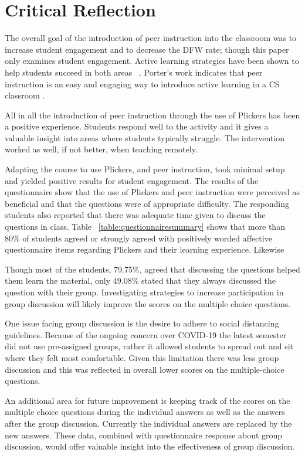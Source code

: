 \documentclass[12pt]{article}
\begin{document}
\section{Critical Reflection}

The overall goal of the introduction of peer instruction into the classroom was to increase student engagement and to decrease the DFW rate; though this paper only examines student engagement.  Active learning strategies have been shown to help students succeed in both areas ~\cite{freemanActiveLearningIncreases2014}.  Porter’s work indicates that peer instruction is an easy and engaging way to introduce active learning in a CS classroom \cite{porterPeerInstructionStudents2011}.

All in all the introduction of peer instruction through the use of Plickers has been a positive experience. Students respond well to the activity and it gives a valuable insight into areas where students typically struggle. The intervention worked as well, if not better, when teaching remotely. 

Adapting the course to use Plickers, and peer instruction, took minimal setup and yielded positive results for student engagement. The results of the questionnaire show that the use of Plickers and peer instruction were perceived as beneficial and that the questions were of appropriate difficulty. The responding students also reported that there was adequate time given to discuss the questions in class. Table ~\ref{table:questionnairesummary} shows that more than 80\% of students agreed or strongly agreed with positively worded affective questionnaire items regarding Plickers and their learning experience. Likewise 

Though most of the students, 79.75\%, agreed that discussing the questions helped them learn the material, only 49.08\% stated that they always discussed the question with their group. Investigating strategies to increase participation in group discussion will likely improve the scores on the multiple choice questions.

One issue facing group discussion is the desire to adhere to social distancing guidelines. Because of the ongoing concern over COVID-19 the latest semester did not use pre-assigned groups, rather it allowed students to spread out and sit where they felt most comfortable. Given this limitation there was less group discussion and this was reflected in overall lower scores on the multiple-choice questions. 

An additional area for future improvement is keeping track of the scores on the multiple choice questions during the individual answers as well as the answers after the group discussion. Currently the individual answers are replaced by the new answers. These data, combined with questionnaire response about group discussion, would offer valuable insight into the effectiveness of group discussion.
\end{document}
